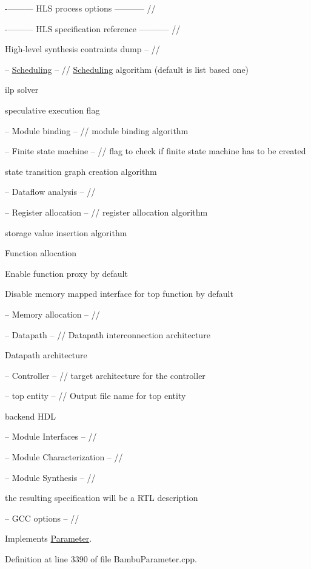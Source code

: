 -\/--------- H\+LS process options ----------- //

-\/--------- H\+LS specification reference ----------- //

High-\/level synthesis contraints dump -- //

-- \hyperlink{classScheduling}{Scheduling} -- // \hyperlink{classScheduling}{Scheduling} algorithm (default is list based one)

ilp solver

speculative execution flag

-- Module binding -- // module binding algorithm

-- Finite state machine -- // flag to check if finite state machine has to be created

state transition graph creation algorithm

-- Dataflow analysis -- //

-- Register allocation -- // register allocation algorithm

storage value insertion algorithm

Function allocation

Enable function proxy by default

Disable memory mapped interface for top function by default

-- Memory allocation -- //

-- Datapath -- // Datapath interconnection architecture

Datapath architecture

-- Controller -- // target architecture for the controller

-- top entity -- // Output file name for top entity

backend H\+DL

-- Module Interfaces -- //

-- Module Characterization -- //

-- Module Synthesis -- //

the resulting specification will be a R\+TL description

-- G\+CC options -- // 

Implements \hyperlink{classParameter_af2bbff2bbfee25d348bd2f0d796d7b3f}{Parameter}.



Definition at line 3390 of file Bambu\+Parameter.\+cpp.




